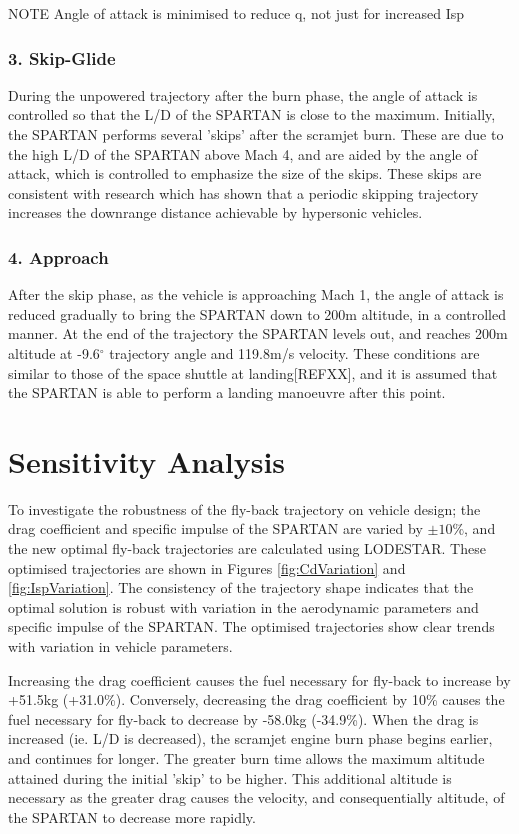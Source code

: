 \documentclass{article}
\begin{document}
NOTE Angle of attack is minimised to reduce q, not just for increased Isp
\subsubsection{3. Skip-Glide}
During the unpowered trajectory after the burn phase, the angle of attack is controlled so that the L/D of the SPARTAN is close to the maximum. Initially, the SPARTAN performs several 'skips' after the scramjet burn. These are due to the high L/D of the SPARTAN above Mach 4, and are aided by the angle of attack, which is controlled to emphasize the size of the skips. These skips are consistent with research which has shown that a periodic skipping trajectory increases the downrange distance achievable by hypersonic vehicles\cite{Eggers1957,Kanda2007}. 


\subsubsection{4. Approach}
After the skip phase, as the vehicle is approaching Mach 1, the angle of attack is reduced gradually to bring the SPARTAN down to 200m altitude, in a controlled manner. 
 At the end of the trajectory the SPARTAN levels out, and reaches 200m altitude at -9.6$^\circ$ trajectory angle and 119.8m/s velocity. These conditions are similar to those of the space shuttle at landing[REFXX], and it is assumed that the SPARTAN is able to perform a landing manoeuvre after this point. 



 




\section{Sensitivity Analysis}
To investigate the robustness of the fly-back trajectory on vehicle design; the drag coefficient and specific impulse of the SPARTAN are varied by $\pm 10\%$, and the new optimal fly-back trajectories are calculated using LODESTAR. These optimised trajectories are shown in Figures \ref{fig:CdVariation} and \ref{fig:IspVariation}.
The consistency of the trajectory shape indicates that the optimal solution is robust with variation in the aerodynamic parameters and specific impulse of the SPARTAN. The optimised trajectories show clear trends with variation in vehicle parameters.

 Increasing the drag coefficient causes the fuel necessary for fly-back to increase by +51.5kg (+31.0\%). Conversely, decreasing the drag coefficient by 10\% causes the fuel necessary for  fly-back to decrease by -58.0kg (-34.9\%). 
 When the drag is increased (ie. L/D is decreased), the scramjet engine burn phase begins earlier, and continues for longer. 
 The greater burn time allows the maximum altitude attained during the initial 'skip' to be higher. 
 This additional altitude is necessary as the greater drag causes the velocity, and consequentially altitude, of the SPARTAN to decrease more rapidly.
\end{document}
